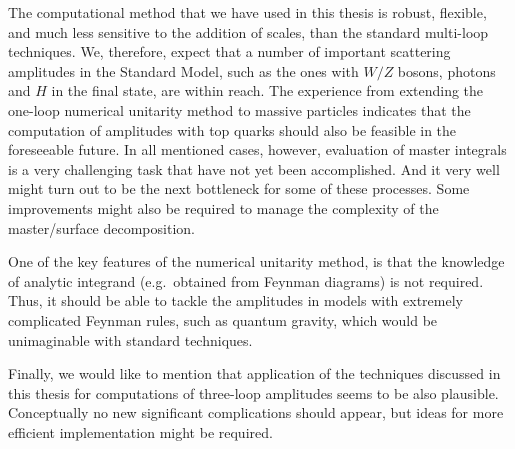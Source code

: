 The computational method that we have used in this thesis is robust, flexible,
and much less sensitive to the addition of scales, than the standard multi-loop techniques.
We, therefore, expect that a number of important scattering amplitudes
in the Standard Model, such as the ones with $W/Z$ bosons, photons and $H$ in the final state, are within reach.
The experience from extending the one-loop numerical unitarity method to massive particles indicates that
the computation of amplitudes with top quarks should also be feasible in the foreseeable future.
In all mentioned cases, however, evaluation of master integrals is a very challenging task that have not yet been accomplished.
And it very well might turn out to be the next bottleneck for some of these processes.
Some improvements might also be required to manage the complexity of the master/surface decomposition.

One of the key features of the numerical unitarity method, is that the knowledge of analytic integrand (e.g.\ obtained from Feynman diagrams) is not required.
Thus, it should be able to tackle the amplitudes in models with extremely complicated Feynman rules, such as quantum gravity,
which would be unimaginable with standard techniques.

Finally, we would like to mention that application of the techniques discussed in this thesis for computations of three-loop amplitudes seems to
be also plausible. Conceptually no new significant complications should appear, but ideas for more efficient implementation might be required.




